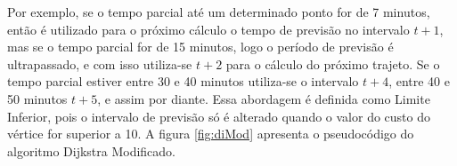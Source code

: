 Por exemplo, se o tempo parcial até um determinado ponto for de 7 minutos, então
é utilizado para o próximo cálculo o tempo de previsão no intervalo $t + 1$, mas se o tempo parcial for de 15 minutos, logo
o período de previsão é ultrapassado, e com isso utiliza-se $t + 2$ para o cálculo do próximo trajeto. Se o tempo parcial
estiver entre 30 e 40 minutos utiliza-se o intervalo $t + 4$, entre 40 e 50 minutos $t + 5$, e assim por diante.
Essa abordagem é definida como Limite Inferior, pois o intervalo de previsão só é alterado quando o 
valor do custo do vértice for superior a 10. A figura \ref{fig:diMod} apresenta o pseudocódigo do algoritmo Dijkstra Modificado.

